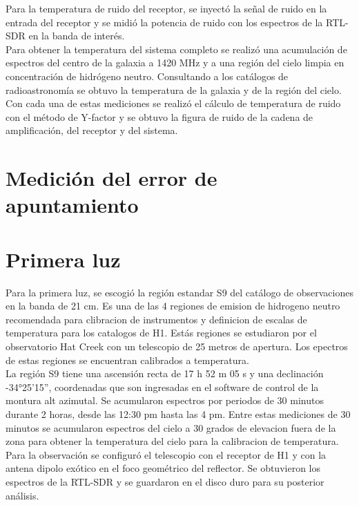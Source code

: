 Para la temperatura de ruido del receptor, se inyectó la señal de ruido en la entrada del receptor y se midió la potencia de ruido con los espectros de la RTL-SDR en la banda de interés.\\

Para obtener la temperatura del sistema completo se realizó una acumulación de espectros del centro de la galaxia a 1420 MHz y a una región del cielo limpia en concentración de hidrógeno neutro. Consultando a los catálogos de radioastronomía se obtuvo la temperatura de la galaxia y de la región del cielo.\\

Con cada una de estas mediciones se realizó el cálculo de temperatura de ruido con el método de Y-factor y se obtuvo la figura de ruido de la cadena de amplificación, del receptor y del sistema.\\


\section{Medición del error de apuntamiento}

\section{Primera luz}

Para la primera luz, se escogió la región estandar S9 del catálogo de observaciones en la banda de 21 cm. Es una de las 4 regiones de emision de hidrogeno neutro recomendada para clibracion de instrumentos y definicion de escalas de temperatura para los catalogos de H1. Estás regiones se estudiaron por el observatorio Hat Creek con un telescopio de 25 metros de apertura. Los epectros de estas regiones se encuentran calibrados a temperatura.\\

La región S9 tiene una ascensión recta de 17 h 52 m 05 s y una declinación -34°25'15'', coordenadas que son ingresadas en el software de control de la montura alt azimutal. Se acumularon espectros por periodos de 30 minutos durante 2 horas, desde las 12:30 pm hasta las 4 pm. Entre estas mediciones de 30 minutos se acumularon espectros del cielo a 30 grados de elevacion fuera de la zona para obtener la temperatura del cielo para la calibracion de temperatura.\\

Para la observación se configuró el telescopio con el receptor de H1 y con la antena dipolo exótico en el foco geométrico del reflector. Se obtuvieron los espectros de la RTL-SDR y se guardaron en el disco duro para su posterior análisis.\\
